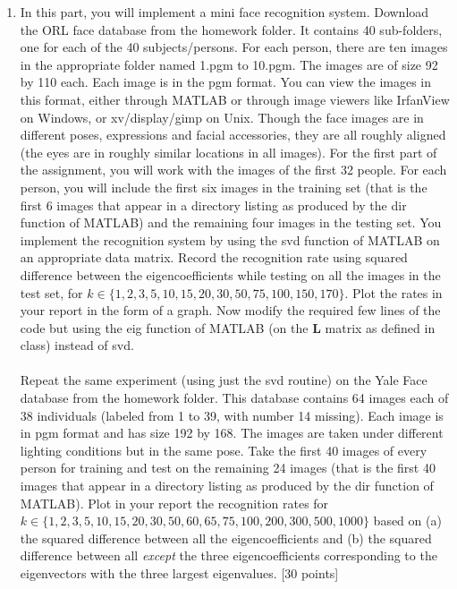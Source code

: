 \documentclass[11pt]{article}
\begin{document}
\begin{enumerate}
\item In this part, you will implement a mini face recognition system. Download the ORL face database from the homework folder. It contains 40 sub-folders, one for each of the 40 subjects/persons. For each person, there are ten images in the appropriate folder named 1.pgm to 10.pgm. The images are of size 92 by 110 each. Each image is in the pgm format. You can view the images in this format, either through MATLAB or through image viewers like IrfanView on Windows, or xv/display/gimp on Unix. Though the face images are in different poses, expressions and facial accessories, they are all roughly aligned (the eyes are in roughly similar locations in all images). For the first part of the assignment, you will work with the images of the first 32 people. For each person, you will include the first six images in the training set (that is the first 6 images that appear in a directory listing as produced by the \textsf{dir} function of MATLAB) and the remaining four images in the testing set. You implement the recognition system by using the \textsf{svd} function of MATLAB on an appropriate data matrix. Record the recognition rate using squared difference between the eigencoefficients while testing on all the images in the test set, for $k \in \{1,2,3,5,10,15,20,30,50,75,100,150,170\}$. Plot the rates in your report in the form of a graph. Now modify the required few lines of the code but using the \textsf{eig} function of MATLAB (on the $\boldsymbol{L}$ matrix as defined in class) instead of \textsf{svd}.
\\
\\
Repeat the same experiment (using just the \textsf{svd} routine) on the Yale Face database from the homework folder. This database contains 64 images each of 38 individuals (labeled from 1 to 39, with number 14 missing). Each image is in pgm format and has size 192 by 168. The images are taken under different lighting conditions but in the same pose. Take the first 40 images of every person for training and test on the remaining 24 images (that is the first 40 images that appear in a directory listing as produced by the dir function of MATLAB). Plot in your report the recognition rates for $k \in \{1,2,3,5,10,15,20,30,50,60, 65,75,100,200,300,500,1000\}$ based on (a) the squared difference between all the eigencoefficients and (b) the squared difference between all \emph{except} the three eigencoefficients corresponding to the eigenvectors with the three largest eigenvalues. \textsf{[30 points]}


\end{enumerate}
\end{document}

